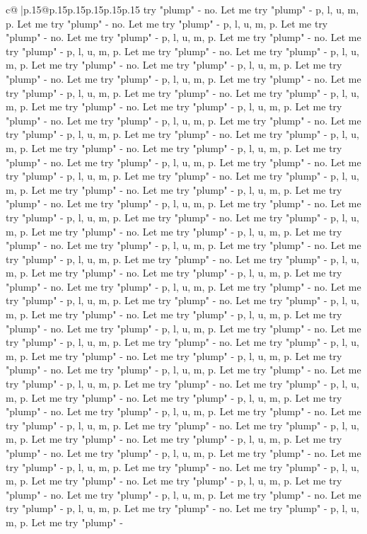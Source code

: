 \documentclass{article}
\begin{document}
{\begin{supertabular}{c@{$\;$}|p{.15\linewidth}@{}p{.15\linewidth}p{.15\linewidth}p{.15\linewidth}p{.15\linewidth}p{.15\linewidth}}
{{{try "plump" {-} no. Let me try "plump" {-} p, l, u, m, p. Let me try "plump" {-} no. Let me try "plump" {-} p, l, u, m, p. Let me try "plump" {-} no. Let me try "plump" {-} p, l, u, m, p. Let me try "plump" {-} no. Let me try "plump" {-} p, l, u, m, p. Let me try "plump" {-} no. Let me try "plump" {-} p, l, u, m, p. Let me try "plump" {-} no. Let me try "plump" {-} p, l, u, m, p. Let me try "plump" {-} no. Let me try "plump" {-} p, l, u, m, p. Let me try "plump" {-} no. Let me try "plump" {-} p, l, u, m, p. Let me try "plump" {-} no. Let me try "plump" {-} p, l, u, m, p. Let me try "plump" {-} no. Let me try "plump" {-} p, l, u, m, p. Let me try "plump" {-} no. Let me try "plump" {-} p, l, u, m, p. Let me try "plump" {-} no. Let me try "plump" {-} p, l, u, m, p. Let me try "plump" {-} no. Let me try "plump" {-} p, l, u, m, p. Let me try "plump" {-} no. Let me try "plump" {-} p, l, u, m, p. Let me try "plump" {-} no. Let me try "plump" {-} p, l, u, m, p. Let me try "plump" {-} no. Let me try "plump" {-} p, l, u, m, p. Let me try "plump" {-} no. Let me try "plump" {-} p, l, u, m, p. Let me try "plump" {-} no. Let me try "plump" {-} p, l, u, m, p. Let me try "plump" {-} no. Let me try "plump" {-} p, l, u, m, p. Let me try "plump" {-} no. Let me try "plump" {-} p, l, u, m, p. Let me try "plump" {-} no. Let me try "plump" {-} p, l, u, m, p. Let me try "plump" {-} no. Let me try "plump" {-} p, l, u, m, p. Let me try "plump" {-} no. Let me try "plump" {-} p, l, u, m, p. Let me try "plump" {-} no. Let me try "plump" {-} p, l, u, m, p. Let me try "plump" {-} no. Let me try "plump" {-} p, l, u, m, p. Let me try "plump" {-} no. Let me try "plump" {-} p, l, u, m, p. Let me try "plump" {-} no. Let me try "plump" {-} p, l, u, m, p. Let me try "plump" {-} no. Let me try "plump" {-} p, l, u, m, p. Let me try "plump" {-} no. Let me try "plump" {-} p, l, u, m, p. Let me try "plump" {-} no. Let me try "plump" {-} p, l, u, m, p. Let me try "plump" {-} no. Let me try "plump" {-} p, l, u, m, p. Let me try "plump" {-} no. Let me try "plump" {-} p, l, u, m, p. Let me try "plump" {-} no. Let me try "plump" {-} p, l, u, m, p. Let me try "plump" {-} no. Let me try "plump" {-} p, l, u, m, p. Let me try "plump" {-} no. Let me try "plump" {-} p, l, u, m, p. Let me try "plump" {-} no. Let me try "plump" {-} p, l, u, m, p. Let me try "plump" {-} no. Let me try "plump" {-} p, l, u, m, p. Let me try "plump" {-} no. Let me try "plump" {-} p, l, u, m, p. Let me try "plump" {-} no. Let me try "plump" {-} p, l, u, m, p. Let me try "plump" {-} no. Let me try "plump" {-} p, l, u, m, p. Let me try "plump" {-} no. Let me try "plump" {-} p, l, u, m, p. Let me try "plump" {-} no. Let me try "plump" {-} p, l, u, m, p. Let me try "plump" {-} no. Let me try "plump" {-} p, l, u, m, p. Let me try "plump" {-} no. Let me try "plump" {-} p, l, u, m, p. Let me try "plump" {-} no. Let me try "plump" {-} p, l, u, m, p. Let me try "plump" {-} no. Let me try "plump" {-} p, l, u, m, p. Let me try "plump" {-} no. Let me try "plump" {-} p, l, u, m, p. Let me try "plump" {-} no. Let me try "plump" {-} p, l, u, m, p. Let me try "plump" {-} no. Let me try "plump" {-} p, l, u, m, p. Let me try "plump" {-} }}}
\end{supertabular}}
\end{document}
